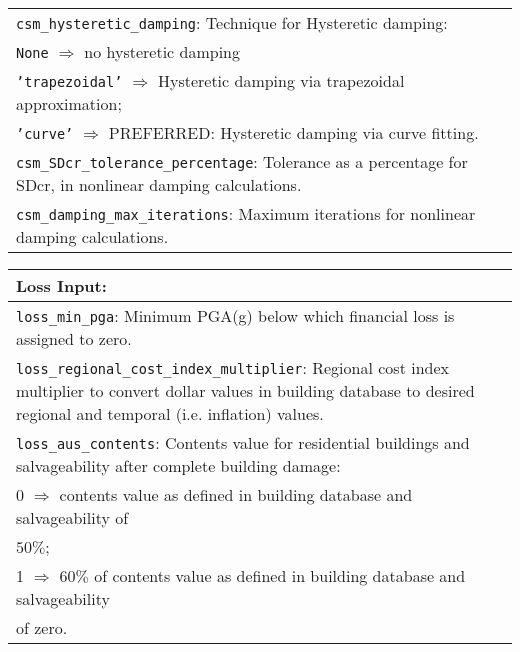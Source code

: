\documentclass[a4paper, 12pt]{report}
\begin{document}
\begin{tabular}{|p{\textwidth}|}
\hline
\vspace{0.1em} \texttt{csm\_hysteretic\_damping}: 
Technique for Hysteretic  damping: \\
 \hspace{0.5em} \texttt{None} $\Rightarrow$ no hysteretic  damping \\
 \hspace{0.5em} \texttt{'trapezoidal'} $\Rightarrow$ Hysteretic  damping via trapezoidal approximation; \\
 \hspace{0.5em} \texttt{'curve'} $\Rightarrow$ \small{PREFERRED}: Hysteretic  damping via curve fitting. \\
\hline
\vspace{0.1em} \texttt{csm\_SDcr\_tolerance\_percentage}: 
Tolerance as a percentage for SDcr, in nonlinear damping calculations.   \\
\hline
\vspace{0.1em} \texttt{csm\_damping\_max\_iterations}: 
 Maximum iterations for nonlinear damping calculations.\\
 \hline
 \end{tabular}


\vspace{2em}
\begin{tabular}{|p{\textwidth}|}
\hline
\vspace{0.3em} \noindent \Large \textbf{Loss Input:} \normalsize \\
\hline
\vspace{0.1em} \texttt{loss\_min\_pga}: 
Minimum PGA(g) below which financial loss is assigned to zero. \\
 \hline
\vspace{0.1em} \texttt{loss\_regional\_cost\_index\_multiplier}: 
Regional cost index multiplier to convert dollar values in building 
database to desired regional and temporal (i.e. inflation) values.\\
\hline
\vspace{0.1em} \texttt{loss\_aus\_contents}: 
Contents value for residential buildings and salvageability after complete building damage:   \\
\hspace{0.5em} 0 $\Rightarrow$ contents value as defined in building 
  database and salvageability of \\
  \hspace{2.5em} $50\%$;\\
\hspace{0.5em} 1 $\Rightarrow$ $60\%$ of contents value as defined in 
building database and salvageability \\
\hspace{2.5em} of zero.\\
  \hline
 \end{tabular}
\end{document}
